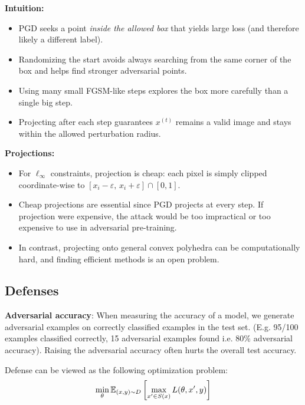 \documentclass[11pt]{article}
\begin{document}
\begin{note}
	\textbf{Intuition:} 
	\begin{itemize}[leftmargin=*]
	  \item PGD seeks a point \emph{inside the allowed box} that yields large loss (and therefore likely a different label).
	  \item Randomizing the start avoids always searching from the same corner of the box and helps find stronger adversarial points.
	  \item Using many small FGSM-like steps explores the box more carefully than a single big step.
	  \item Projecting after each step guarantees $x^{(t)}$ remains a valid image and stays within the allowed perturbation radius.
	\end{itemize}
\end{note}

\begin{note}
    \textbf{Projections:}
    \begin{itemize}[leftmargin=*]
      \item For $\ell_\infty$ constraints, projection is cheap: each pixel is simply clipped coordinate-wise to $[x_i-\varepsilon,\,x_i+\varepsilon]\cap[0,1]$. 
      \item Cheap projections are essential since PGD projects at every step. If projection were expensive, the attack would be too impractical or too expensive to use in adversarial pre-training.
      \item In contrast, projecting onto general convex polyhedra can be computationally hard, and finding efficient methods is an open problem.
    \end{itemize}
\end{note}

\subsection{Defenses}
\textbf{Adversarial accuracy}: When measuring the accuracy of a model, we generate adversarial examples on correctly classified examples in the test set.  (E.g. 95/100 examples classified correctly, 15 adversarial examples found i.e. 80\% adversarial accuracy). Raising the adversarial accuracy often hurts the overall test accuracy. 

Defense can be viewed as the following optimization problem:
\[
	\min_\theta \mathbb{E}_{(x, y) \sim D}\left[ \max_{x' \in S(x)} L(\theta, x', y) \right]
\]
\end{document}
